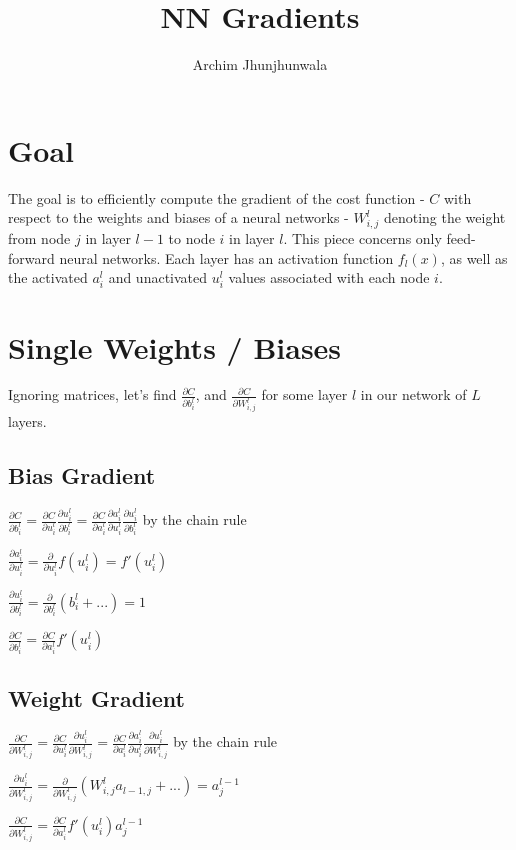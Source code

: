 \documentclass[14pt]{extarticle}
\title{NN Gradients}
\author{Archim Jhunjhunwala}
\begin{document}
\maketitle
\section{Goal}

The goal is to efficiently compute the gradient of the cost function - $C$ with respect to the weights and biases of a neural networks - $W^l_{i,j}$ denoting the weight from node $j$ in layer $l-1$ to node $i$ in layer $l$. This piece concerns only feed-forward neural networks. Each layer has an activation function $f_l(x)$, as well as the activated $a^l_i$ and unactivated $u^l_i$ values associated with each node $i$.

\section{Single Weights / Biases}

Ignoring matrices, let's find $\frac{\partial C}{\partial b^l_{i}}$, and $\frac{\partial C}{\partial W^l_{i,j}}$ for some layer $l$ in our network of $L$ layers.
\subsection{Bias Gradient}
\begin{flushleft}
    
    $\frac{\partial C}{\partial b^l_i}=\frac{\partial C}{\partial u^l_i}\frac{\partial u^l_i}{\partial b_i^l}=\frac{\partial C}{\partial a^l_i}\frac{\partial a^l_i}{\partial u^l_i}\frac{\partial u^l_i}{\partial b^l_i}$ by the chain rule

    $\frac{\partial a^l_i}{\partial u^l_i}=\frac{\partial}{\partial u^l_i}f(u^l_i)=f'(u^l_i)$
    
    $\frac{\partial u^l_i}{\partial b^l_i}=\frac{\partial}{\partial b^l_i}(b^l_i+...)=1$
    
    $\frac{\partial C}{\partial b^l_i}=\frac{\partial C}{\partial a^l_i}f'(u^l_i)$
    
\end{flushleft}
\subsection{Weight Gradient}
\begin{flushleft}
   
    $\frac{\partial C}{\partial W^l_{i,j}}=\frac{\partial C}{\partial u^l_i}\frac{\partial u^l_i}{\partial W^l_{i,j}}=\frac{\partial C}{\partial a^l_i}\frac{\partial a^l_i}{\partial u^l_i}\frac{\partial u^l_i}{\partial W^l_{i,j}}$ by the chain rule

    $\frac{\partial u^l_i}{\partial W^l_{i,j}}=\frac{\partial}{\partial W^l_{i,j}}(W^l_{i,j}a_{l-1,j}+...)=a^{l-1}_j$
    
    $\frac{\partial C}{\partial W^l_{i,j}}=\frac{\partial C}{\partial a^l_i}f'(u^l_i)a^{l-1}_j$
 
\end{flushleft}
\end{document}
